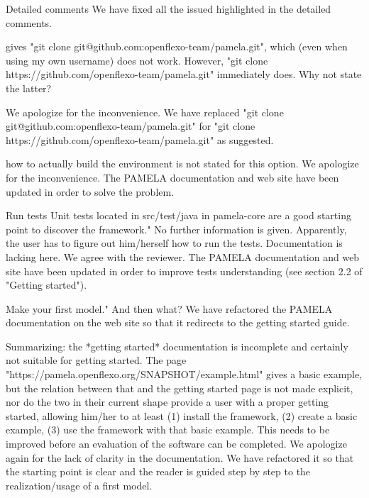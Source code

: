 \documentclass[10pt]{article}
\begin{document}
\begin{response}{Detailed comments}
We have fixed all the issued highlighted in the detailed comments.
\end{response}


\begin{response}{gives "git clone git@github.com:openflexo-team/pamela.git", which (even when using my own username) does not work. However, "git clone https://github.com/openflexo-team/pamela.git" immediately does. Why not state the latter?
}

We apologize for the inconvenience. We have replaced "git clone git@github.com:openflexo-team/pamela.git" for "git clone https://github.com/openflexo-team/pamela.git" as suggested.
\end{response}

\begin{response}{how to actually build the environment is not stated for this option.}
We apologize for the inconvenience. The PAMELA documentation and web site have been updated in order to solve the problem.
\end{response}

\begin{response}{Run tests Unit tests located in src/test/java in pamela-core are a good starting point to discover the framework." No further information is given. Apparently, the user has to figure out him/herself how to run the tests. Documentation is lacking here.
}
We agree with the reviewer. The PAMELA documentation and web site have been updated in order to improve tests understanding (see section 2.2 of "Getting started"). 
\end{response}

\begin{response}{Make your first model." And then what?
}
We have refactored the PAMELA documentation on the web site so that it redirects to the getting started guide.
\end{response}

\begin{response}{Summarizing: the *getting started* documentation is incomplete and certainly not suitable for getting started. The page "https://pamela.openflexo.org/SNAPSHOT/example.html" gives a basic example, but the relation between that and the getting started page is not made explicit, nor do the two in their current shape provide a user with a proper getting started, allowing him/her to at least (1) install the framework, (2) create a basic example, (3) use the framework with that basic example. This needs to be improved before an evaluation of the software can be completed.
}
We apologize again for the lack of clarity in the documentation. We have refactored it so that the starting point is clear and the reader is guided step by step to the realization/usage of a first model.
\end{response}
\end{document}
